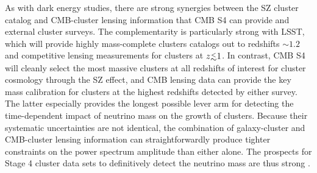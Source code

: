 As with dark energy studies, there are strong synergies between the SZ cluster catalog and CMB-cluster lensing information that CMB S4 can provide and external cluster surveys. The complementarity is particularly strong with LSST, which will provide highly mass-complete clusters catalogs out to redshifts $\sim1.2$ and competitive lensing measurements for clusters at $z\lsim 1$. In contrast, CMB S4 will cleanly select the most massive clusters at all redshifts of interest for cluster cosmology through the SZ effect, and CMB lensing data can provide the key mass calibration for clusters at the highest redshifts detected by either survey. The latter especially provides the longest possible lever arm for detecting the time-dependent impact of neutrino mass on the growth of clusters. Because their systematic uncertainties are not identical, the combination of galaxy-cluster and CMB-cluster lensing information can straightforwardly produce tighter constraints on the power spectrum amplitude than either alone. The prospects for Stage 4 cluster data sets to definitively detect the neutrino mass are thus strong \cite{Mantz:2014paa,Wang:2005vr}.




